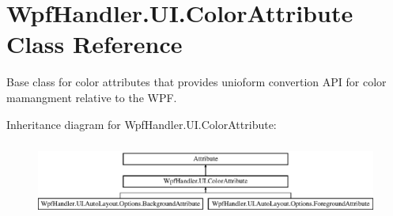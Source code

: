 \hypertarget{class_wpf_handler_1_1_u_i_1_1_color_attribute}{}\section{Wpf\+Handler.\+U\+I.\+Color\+Attribute Class Reference}
\label{class_wpf_handler_1_1_u_i_1_1_color_attribute}


Base class for color attributes that provides unioform convertion A\+PI for color mamangment relative to the W\+PF.  


Inheritance diagram for Wpf\+Handler.\+U\+I.\+Color\+Attribute\+:\begin{figure}[H]
\begin{center}
\leavevmode
\includegraphics[height=2.500000cm]{d6/dab/class_wpf_handler_1_1_u_i_1_1_color_attribute}
\end{center}
\end{figure}
